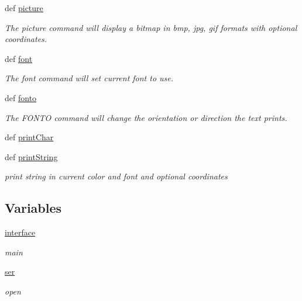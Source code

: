 \begin{DoxyCompactItemize}
def \hyperlink{namespaceez_l_c_d3xx_a3bdde0a3f8505adbfb3c4b7107da7650}{picture}
\begin{DoxyCompactList}\small\item\em The picture command will display a bitmap in bmp, jpg, gif formats with optional coordinates. \end{DoxyCompactList}\item 
def \hyperlink{namespaceez_l_c_d3xx_a7099c8ffc9b76ad3213d241bb8b8070f}{font}
\begin{DoxyCompactList}\small\item\em The font command will set current font to use. \end{DoxyCompactList}\item 
def \hyperlink{namespaceez_l_c_d3xx_a445e7a916dbdae456f88bea5fcd88745}{fonto}
\begin{DoxyCompactList}\small\item\em The F\-O\-N\-T\-O command will change the orientation or direction the text prints. \end{DoxyCompactList}\item 
def \hyperlink{namespaceez_l_c_d3xx_afe8f092541df1ab4d72798e5f3b4e66d}{print\-Char}
\item 
def \hyperlink{namespaceez_l_c_d3xx_ac3a90d479a0423de66988b9850f4852c}{print\-String}
\begin{DoxyCompactList}\small\item\em print string in current color and font and optional coordinates \end{DoxyCompactList}\end{DoxyCompactItemize}
\subsection*{Variables}
\begin{DoxyCompactItemize}
\item 
\hypertarget{namespaceez_l_c_d3xx_afcf658508c426a01de8e18e7fb3530ca}{\hyperlink{namespaceez_l_c_d3xx_afcf658508c426a01de8e18e7fb3530ca}{interface}}\label{namespaceez_l_c_d3xx_afcf658508c426a01de8e18e7fb3530ca}

\begin{DoxyCompactList}\small\item\em main \end{DoxyCompactList}\item 
\hypertarget{namespaceez_l_c_d3xx_a11773e4014d1da38ff2a8a46723c5b97}{\hyperlink{namespaceez_l_c_d3xx_a11773e4014d1da38ff2a8a46723c5b97}{ser}}\label{namespaceez_l_c_d3xx_a11773e4014d1da38ff2a8a46723c5b97}

\begin{DoxyCompactList}\small\item\em open \end{DoxyCompactList}\end{DoxyCompactItemize}


